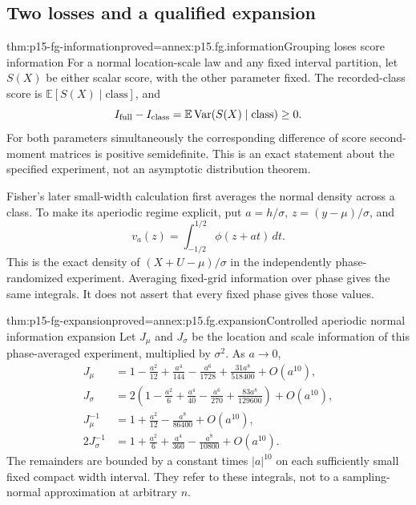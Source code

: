 \subsection{Two losses and a qualified expansion}

\begin{hbtheorem}{thm:p15-fg-information}{proved=annex:p15.fg.information}{Grouping loses score information}
For a normal location-scale law and any fixed interval partition, let
\(S(X)\) be either scalar score, with the other parameter fixed. The
recorded-class score is \(\mathbb E[S(X)\mid\text{class}]\), and
\[
 I_{\rm full}-I_{\rm class}
   =\mathbb E\operatorname{Var}(S(X)\mid\text{class})\geq0.
\]
For both parameters simultaneously the corresponding difference of score
second-moment matrices is positive semidefinite. This is an exact statement
about the specified experiment, not an asymptotic distribution theorem.
\end{hbtheorem}

Fisher's later small-width calculation first averages the normal density
across a class. To make its aperiodic regime explicit, put
\(a=h/\sigma\), \(z=(y-\mu)/\sigma\), and
\[
 v_a(z)=\int_{-1/2}^{1/2}\phi(z+at)\,dt.
\]
This is the exact density of \((X+U-\mu)/\sigma\) in the independently
phase-randomized experiment. Averaging fixed-grid information over phase
gives the same integrals. It does not assert that every fixed phase gives
those values.

\begin{hbtheorem}{thm:p15-fg-expansion}{proved=annex:p15.fg.expansion}{Controlled aperiodic normal information expansion}
Let \(J_\mu\) and \(J_\sigma\) be the location and scale information
of this phase-averaged experiment, multiplied by \(\sigma^2\).
As \(a\to0\),
\[
\begin{aligned}
 J_\mu&=1-\frac{a^2}{12}+\frac{a^4}{144}
              -\frac{a^6}{1728}+\frac{31a^8}{518400}+O(a^{10}),\\
 J_\sigma&=2\left(1-\frac{a^2}{6}+\frac{a^4}{40}
                  -\frac{a^6}{270}+\frac{83a^8}{129600}\right)
                  +O(a^{10}),\\
 J_\mu^{-1}&=1+\frac{a^2}{12}-\frac{a^8}{86400}+O(a^{10}),\\
 2J_\sigma^{-1}&=1+\frac{a^2}{6}+\frac{a^4}{360}
                  -\frac{a^8}{10800}+O(a^{10}).
\end{aligned}
\]
The remainders are bounded by a constant times \(|a|^{10}\) on each
sufficiently small fixed compact width interval. They refer to these
integrals, not to a sampling-normal approximation at arbitrary \(n\).
\end{hbtheorem}

